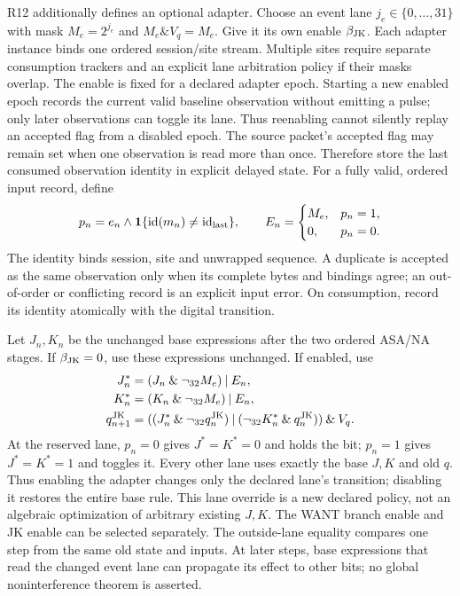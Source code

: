 R12 additionally defines an optional  adapter.
Choose an event lane $j_e\in\{0,\ldots,31\}$ with mask $M_e=2^{j_e}$ and
$M_e\mathbin{\&}V_q=M_e$. Give it its own enable $\beta_{\rm JK}$.
Each adapter instance binds one ordered session/site stream. Multiple sites
require separate consumption trackers and an explicit lane arbitration policy
if their masks overlap. The enable is fixed for a declared adapter epoch.
Starting a new enabled epoch records the current valid baseline observation
without emitting a pulse; only later observations can toggle its lane. Thus
reenabling cannot silently replay an accepted flag from a disabled epoch.
The source packet's accepted flag may remain set when one observation is read
more than once. Therefore store the last consumed observation identity in
explicit delayed state. For a fully valid, ordered input record, define
\begin{equation}
 p_n=e_n\land\boldsymbol1\{\operatorname{id}(m_n)\ne\operatorname{id}_{\rm last}\},
 \qquad E_n=\begin{cases}M_e,&p_n=1,\\0,&p_n=0.\end{cases}
\end{equation}
The identity binds session, site and unwrapped sequence. A duplicate is accepted
as the same observation only when its complete bytes and bindings agree; an
out-of-order or conflicting record is an explicit input error. On consumption,
record its identity atomically with the digital transition.

Let $J_n,K_n$ be the unchanged base expressions after the two ordered ASA/NA
stages. If $\beta_{\rm JK}=0$, use these expressions unchanged. If enabled, use
\begin{align}
 J_n^*&=(J_n\mathbin{\&}\neg_{32}M_e)\mathbin{|}E_n,\\
 K_n^*&=(K_n\mathbin{\&}\neg_{32}M_e)\mathbin{|}E_n,\\
 q_{n+1}^{\rm JK}&=((J_n^*\mathbin{\&}\neg_{32}q_n^{\rm JK})
             \mathbin{|}(\neg_{32}K_n^*\mathbin{\&}q_n^{\rm JK}))\mathbin{\&}V_q.
\end{align}
At the reserved lane, $p_n=0$ gives $J^*=K^*=0$ and holds the bit;
$p_n=1$ gives $J^*=K^*=1$ and toggles it. Every other lane uses exactly the
base $J,K$ and old $q$. Thus enabling the adapter changes only the declared
lane's transition; disabling it restores the entire base rule. This lane
override is a new declared policy, not an algebraic optimization of arbitrary
existing $J,K$. The WANT branch enable and JK enable can be selected separately.
The outside-lane equality compares one step from the same old state and inputs.
At later steps, base expressions that read the changed event lane can propagate
its effect to other bits; no global noninterference theorem is asserted.

